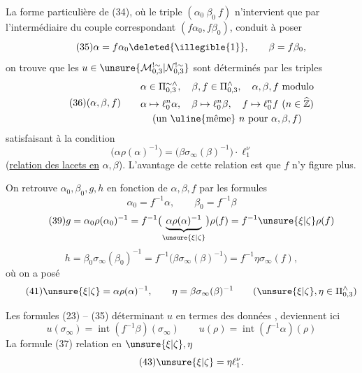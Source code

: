 La forme particulière de (34), où le triple $(\alpha_0\ \beta_0\ f)$ n'intervient que par l'intermédiaire du couple correspondant $(f\alpha_0,f\beta_0)$, conduit à poser
\[
\tag{35}
\alpha=f\alpha_0\deleted{\illegible{1}},\qquad\beta=f\beta_0,
\]
on trouve que les $u\in\unsure{\mathcal{M}_{0,3}^{!\sim}|\mathcal{N}_{0,3}^{!\sim}}$ sont déterminés par les triples
\[
\tag{36}
(\alpha,\beta,f)\qquad
\begin{gathered}
\alpha\in\Pi_{0,3}^{\sim\wedge},\quad\beta,f\in\Pi_{0,3}^{\wedge},\quad
\alpha,\beta,f\ \text{modulo}\\
\alpha\mapsto\ell_0^n\alpha,\quad\beta\mapsto\ell_0^n\beta,\quad
f\mapsto\ell_0^n f\ (n\in\widehat{\mathbb Z})\\
\text{(un \uline{même} }n\text{ pour }\alpha,\beta,f\text{)}
\end{gathered}
\]
satisfaisant à la condition
\[
\tag{37}
\boxed{\bigl(\alpha\rho(\alpha)^{-1}\bigr)
=\bigl(\beta\sigma_\infty(\beta)^{-1}\bigr)\cdot\ell_1^\nu}
\]
(\uline{relation des lacets en} $\alpha,\beta$). L'avantage de cette relation est que $f$ n'y figure plus.

On retrouve $\alpha_0,\beta_0,g,h$ en fonction de $\alpha,\beta,f$ par les formules
\[
\tag{38}
\alpha_0=f^{-1}\alpha,\qquad\beta_0=f^{-1}\beta
\]
\[
\tag{39}
g=\alpha_0\rho(\alpha_0)^{-1}
=f^{-1}\bigl(\underbrace{\alpha\rho(\alpha)^{-1}}_{\unsure{\xi|\zeta}}\bigr)\rho(f)
=f^{-1}\unsure{\xi|\zeta}\rho(f)
\]
\[
\tag{40}
h=\beta_0\sigma_\infty(\beta_0)^{-1}
=f^{-1}\bigl(\beta\sigma_\infty(\beta)^{-1}\bigr)
=f^{-1}\eta\sigma_\infty(f),
\]
où on a posé
\[
\tag{41}
\unsure{\xi|\zeta}=\alpha\rho(\alpha)^{-1},\qquad
\eta=\beta\sigma_\infty(\beta)^{-1}
\qquad(\unsure{\xi|\zeta},\eta\in\Pi_{0,3}^{\wedge})
\]


Les formules (23) -- (35) déterminant $u$ en termes des données , deviennent ici
\[
\tag{42}
u(\sigma_\infty)=\operatorname{int}(f^{-1}\beta)(\sigma_\infty)
\qquad u(\rho)=\operatorname{int}(f^{-1}\alpha)(\rho)
\]
La formule (37)  relation en $\unsure{\xi|\zeta},\eta$
\[
\tag{43}
\unsure{\xi|\zeta}=\eta\ell_1^\nu.
\]

